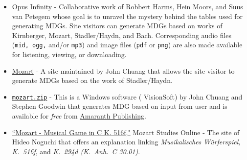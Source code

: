 \documentclass[letterpaper,x11names,svgnames,10pt]{article}
\begin{document}
{\begin{itemize}
	\item \hyperref{https://opus-infinity.org}{}{}{Opus Infinity} - Collaborative work of Robbert Harms, Hein Moors, and Suus van Petegem whose goal is to unravel the mystery behind the tables used for generating MDGs.  Site visitors can generate MDGs based on works of Kirnberger, Mozart, Stadler/Haydn, and Bach.  Corresponding audio files ({\tt mid, ogg,} and/or {\tt mp3}) and image files ({\tt pdf} or {\tt png}) are also made available for listening, viewing, or downloading.
	
	\item  \hyperref{http://sunsite.univie.ac.at/Mozart/dice/}{}{}{Mozart} - A site maintained by John Chuang that allows the site visitor to generate MDGs based on the work of Stadler/Haydn.
 	
 	\item \hyperref{http://www.amaranthpublishing.com/MozartDiceGame.htm}{}{}{\tt mozart.zip} -  This is a Windows software ( VisionSoft) by John Chuang and Stephen Goodwin that generates MDG based on input from user and is available for {\it free} from  \hyperref{http://www.amaranthpublishing.com/MozartDiceGame.htm}{}{}{Amaranth Publishing}.  
 	
 	\item \hyperref{(http://www.asahi-net.or.jp/\~rb5h-ngc/e/k516f.htm}{}{}{``Mozart - Musical Game in C K. 516f,"}	Mozart Studies Online - The site of Hideo Noguchi that offers an explanation linking {\em Musikalisches W\"{u}rferspiel, K.\ 516f}, and  {\em K.\ 294d (K.\ Anh.\ C 30.01)}. 
\end{itemize}

}
\end{document}
